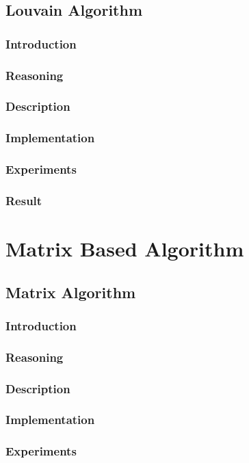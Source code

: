 \subsection{Louvain Algorithm}
\subsubsection{Introduction}
\subsubsection{Reasoning}
\subsubsection{Description}
\subsubsection{Implementation}
\subsubsection{Experiments}
\subsubsection{Result}

\section{Matrix Based Algorithm}
\subsection{Matrix Algorithm}
\subsubsection{Introduction}
\subsubsection{Reasoning}
\subsubsection{Description}
\subsubsection{Implementation}
\subsubsection{Experiments}
